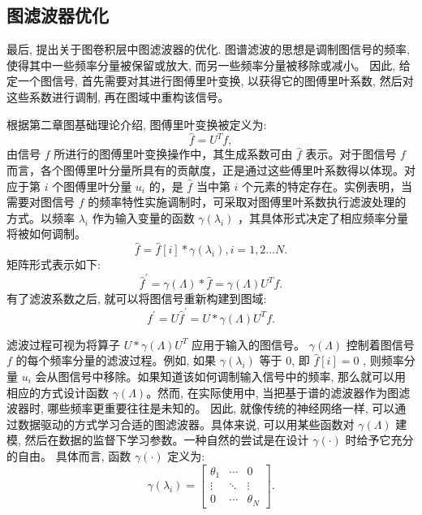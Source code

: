 \subsection{图滤波器优化}


最后, 提出关于图卷积层中图滤波器的优化. 图谱滤波的思想是调制图信号的频率, 使得其中一些频率分量被保留或放大, 而另一些频率分量被移除或减小。 因此, 给定一个图信号, 首先需要对其进行图傅里叶变换, 以获得它的图傅里叶系数, 然后对这些系数进行调制, 再在图域中重构该信号。

根据第二章图基础理论介绍, 图傅里叶变换被定义为:
\[
\widehat{f} = {U}^{T}f, 
\]
由信号 \(f\) 所进行的图傅里叶变换操作中，其生成系数可由 \(\widehat{f}\) 表示。对于图信号 \(f\) 而言，各个图傅里叶分量所具有的贡献度，正是通过这些傅里叶系数得以体现。对应于第 \({i}\) 个图傅里叶分量 \({u}_{i}\) 的，是 \(\widehat{f}\) 当中第 \({i}\) 个元素的特定存在。实例表明，当需要对图信号 \(f\) 的频率特性实施调制时，可采取对图傅里叶系数执行滤波处理的方式。以频率 \({\lambda }_{i}\) 作为输入变量的函数 \(\gamma \left( {\lambda }_{i}\right)\) ，其具体形式决定了相应频率分量将被如何调制。
\[
\widehat{f} = \widehat{f}\left\lbrack  i\right\rbrack   * \gamma \left( {\lambda }_{i}\right) , i = 1, 2\ldots N.
\]
矩阵形式表示如下:
\[
{\widehat{f}}^{\prime } = \gamma \left( \Lambda \right)  * \widehat{f} = \gamma \left( \Lambda \right) {U}^{T}f.
\]
有了滤波系数之后, 就可以将图信号重新构建到图域:
\[
{f}^{\prime } = U{\widehat{f}}^{\prime } = U * \gamma \left( \Lambda \right) {U}^{T}f.
\]

滤波过程可视为将算子 \(U * \gamma \left( \Lambda \right) {U}^{T}\) 应用于输入的图信号。 \(\gamma \left( \Lambda \right)\) 控制着图信号 \(f\) 的每个频率分量的滤波过程。例如, 如果 \(\gamma \left( {\lambda }_{i}\right)\) 等于 0, 即 \(\widehat{f}\left\lbrack  {i}\right\rbrack   = 0\) , 则频率分量 \({u}_{i}\) 会从图信号中移除。如果知道该如何调制输入信号中的频率, 那么就可以用相应的方式设计函数 \(\gamma \left( \Lambda \right)\)。然而, 在实际使用中, 当把基于谱的滤波器作为图滤波器时, 哪些频率更重要往往是未知的。 因此, 就像传统的神经网络一样, 可以通过数据驱动的方式学习合适的图滤波器。具体来说, 可以用某些函数对 \(\gamma \left( \Lambda \right)\) 建模, 然后在数据的监督下学习参数。一种自然的尝试是在设计 \(\gamma \left( \cdot \right)\) 时给予它充分的自由。 具体而言, 函数 \(\gamma \left( \cdot \right)\) 定义为:
\[
\gamma \left( {\lambda }_{i}\right)  = \left\lbrack  \begin{matrix} {\theta }_{1} & \cdots & 0 \\  \vdots &  \ddots  & \vdots \\  0 & \cdots & {\theta }_{N} \end{matrix}\right\rbrack.
\]

